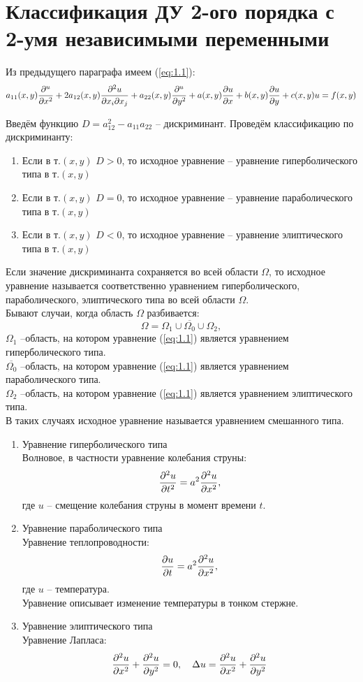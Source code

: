 \documentclass[../main.tex]{subfiles}
\begin{document}
\section{Классификация ДУ 2-ого порядка с 2-умя независимыми переменными}
Из предыдущего параграфа имеем (\ref{eq:1.1}):
\[
	a_{11}(x,y)\frac{\partial ^u}{\partial x^2} + 2a_{12}(x,y)\frac{\partial ^2u}{\partial x_i \partial{x_j}} +
	a_{22}(x,y)\frac{\partial ^u}{\partial y^2} + a(x,y)\frac{\partial u}{\partial x} + b(x,y)\frac{\partial u}{\partial y} + c(x,y)u = f(x,y)
\]

Введём функцию $D = a_{12}^2-a_{11}a_{22}$ -- дискриминант.
Проведём классификацию по дискриминанту:
\begin{enumerate}
	\item
	      Если в т.$(x,y)$ $D>0$, то исходное уравнение --
	      уравнение гиперболического типа в т.$(x,y)$
	\item
	      Если в т.$(x,y)$ $D=0$, то исходное уравнение --
	      уравнение параболического типа в т.$(x,y)$
	\item
	      Если в т.$(x,y)$ $D<0$, то исходное уравнение --
	      уравнение элиптического типа в т.$(x,y)$
\end{enumerate}

Если значение дискриминанта сохраняется во всей области $\Omega$,
то исходное уравнение называется соответственно уравнением гиперболического,
параболического, элиптического типа во всей области $\Omega$.\\

Бывают случаи, когда область $\Omega$ разбивается:
\[\Omega = \Omega_1 \cup \overline{\Omega_0} \cup \Omega_2, \]
$\Omega_1$ --область, на котором уравнение (\ref{eq:1.1}) является уравнением гиперболического типа.\\
$\overline{\Omega_0}$ --область, на котором уравнение (\ref{eq:1.1}) является уравнением параболического типа.\\
$\Omega_2$ --область, на котором уравнение (\ref{eq:1.1}) является уравнением элиптического типа.\\
В таких случаях исходное уравнение называется уравнением смешанного типа.

\begin{enumerate}
	\item Уравнение гиперболического типа\\
	      Волновое, в частности уравнение колебания струны:
	      \[\frac{\partial ^2u}{\partial t^2}=a^2\frac{\partial ^2u}{\partial x^2},\]
	      где $u$ -- смещение колебания струны в момент времени $t$.
	\item Уравнение параболического типа\\
	      Уравнение теплопроводности:
	      \[\frac{\partial u}{\partial t}=a^2\frac{\partial ^2u}{\partial x^2},\]
	      где $u$ -- температура.\\
	      Уравнение описывает изменение температуры в тонком стержне.
	\item Уравнение элиптического типа\\
	      Уравнение Лапласа:
	      \[
		      \frac{\partial ^2u}{\partial x^2}+\frac{\partial ^2u}{\partial y^2} = 0,\quad
		      \Delta u=\frac{\partial ^2u}{\partial x^2}+\frac{\partial ^2u}{\partial y^2}
	      \]
\end{enumerate}
\end{document}
